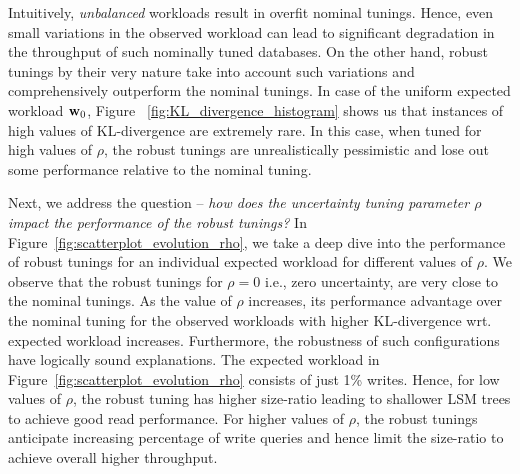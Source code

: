 Intuitively, \emph{unbalanced} workloads result in overfit nominal tunings.
Hence, even small variations in the observed workload can lead to 
    significant degradation in the throughput of such nominally tuned databases. 
On the other hand, robust tunings by their very nature take into account such
    variations and comprehensively outperform the nominal tunings.
In case of the uniform expected workload ${{\bf{w}}}_0$, 
    Figure ~\ref{fig:KL_divergence_histogram} shows us that instances of 
    high values of KL-divergence are extremely rare.
In this case, when tuned for high values of $\rho$, the robust tunings are 
    unrealistically pessimistic and lose out some performance relative to the 
    nominal tuning.

Next, we address the question -- \emph{how does the uncertainty tuning parameter
    $\rho$ impact the performance of the robust tunings?}
In Figure~\ref{fig:scatterplot_evolution_rho}, we take a deep dive into
    the performance of robust tunings for an individual
    expected workload for different values of $\rho$.
We observe that the robust tunings for $\rho=0$ i.e., zero uncertainty, are 
    very close to the nominal tunings.
As the value of $\rho$ increases,
    its performance advantage over the nominal tuning for the observed 
    workloads with higher KL-divergence wrt. expected workload
    increases.
Furthermore, the robustness of such configurations have logically sound 
    explanations.
The expected workload in 
    Figure~\ref{fig:scatterplot_evolution_rho} consists of just 1\% writes.
Hence, for low values of $\rho$, the robust tuning has higher size-ratio leading to
    shallower LSM trees to achieve good read performance.
For higher values of $\rho$, the robust tunings anticipate increasing
    percentage of write queries and hence limit the size-ratio to achieve overall
    higher throughput.

